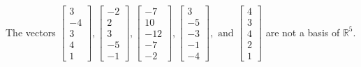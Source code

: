 \begin{exercise}
\begin{exerciseStatement}
  \end{exerciseStatement}
  \begin{exerciseAnswer}
   The vectors \(\left[\begin{array}{r}
3 \\
-4 \\
3 \\
4 \\
1
\end{array}\right] , \left[\begin{array}{r}
-2 \\
2 \\
3 \\
-5 \\
-1
\end{array}\right] , \left[\begin{array}{r}
-7 \\
10 \\
-12 \\
-7 \\
-2
\end{array}\right] , \left[\begin{array}{r}
3 \\
-5 \\
-3 \\
-1 \\
-4
\end{array}\right] , \text{ and } \left[\begin{array}{r}
4 \\
3 \\
4 \\
2 \\
1
\end{array}\right]\) 
  	 are not  a basis of \(\mathbb{R}^5\).
  


  \end{exerciseAnswer}
\end{exercise}